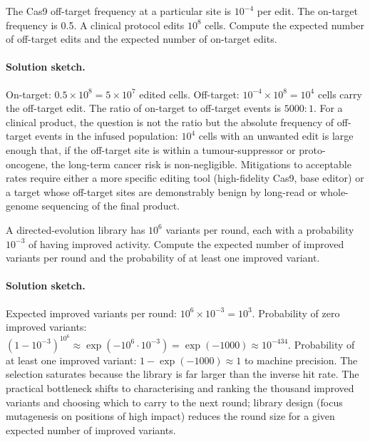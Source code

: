 \begin{exercise}
The Cas9 off-target frequency at a particular site is $10^{-4}$ per
edit. The on-target frequency is 0.5. A clinical protocol edits
$10^8$ cells. Compute the expected number of off-target edits and
the expected number of on-target edits.

\paragraph{Solution sketch.}
On-target: $0.5 \times 10^{8} = 5 \times 10^{7}$ edited cells.
Off-target: $10^{-4} \times 10^{8} = 10^{4}$ cells carry the
off-target edit. The ratio of on-target to off-target events is
$5000:1$. For a clinical product, the question is not the ratio but
the absolute frequency of off-target events in the infused
population: $10^{4}$ cells with an unwanted edit is large enough
that, if the off-target site is within a tumour-suppressor or
proto-oncogene, the long-term cancer risk is non-negligible.
Mitigations to acceptable rates require either a more specific
editing tool (high-fidelity Cas9, base editor) or a target whose
off-target sites are demonstrably benign by long-read or whole-genome
sequencing of the final product.
\end{exercise}

\begin{exercise}
A directed-evolution library has $10^6$ variants per round, each
with a probability $10^{-3}$ of having improved activity. Compute the
expected number of improved variants per round and the probability of
at least one improved variant.

\paragraph{Solution sketch.}
Expected improved variants per round: $10^{6} \times 10^{-3} =
10^{3}$. Probability of zero improved variants:
$(1 - 10^{-3})^{10^{6}} \approx \exp(-10^{6} \cdot 10^{-3}) =
\exp(-1000) \approx 10^{-434}$. Probability of at least one improved
variant: $1 - \exp(-1000) \approx 1$ to machine precision. The
selection saturates because the library is far larger than the
inverse hit rate. The practical bottleneck shifts to characterising
and ranking the thousand improved variants and choosing which to
carry to the next round; library design (focus mutagenesis on
positions of high impact) reduces the round size for a given
expected number of improved variants.
\end{exercise}

